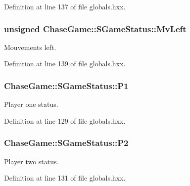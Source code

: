 Definition at line 137 of file globals.\-hxx.

\hypertarget{struct_chase_game_1_1_s_game_status_ae06758bdc7c2bda68801afd314837532}{
\subsubsection[{Mv\-Left}]{\setlength{\rightskip}{0pt plus 5cm}unsigned Chase\-Game\-::\-S\-Game\-Status\-::\-Mv\-Left}}\label{struct_chase_game_1_1_s_game_status_ae06758bdc7c2bda68801afd314837532}


Mouvements left. 



Definition at line 139 of file globals.\-hxx.

\hypertarget{struct_chase_game_1_1_s_game_status_ae939192c0ce625f9cbec50549ec88fac}{
\subsubsection[{P1}]{ Chase\-Game\-::\-S\-Game\-Status\-::\-P1}}\label{struct_chase_game_1_1_s_game_status_ae939192c0ce625f9cbec50549ec88fac}


Player one status. 



Definition at line 129 of file globals.\-hxx.

\hypertarget{struct_chase_game_1_1_s_game_status_a21840b6b133cd5a73d5c0cd3b01116e2}{
\subsubsection[{P2}]{ Chase\-Game\-::\-S\-Game\-Status\-::\-P2}}\label{struct_chase_game_1_1_s_game_status_a21840b6b133cd5a73d5c0cd3b01116e2}


Player two status. 



Definition at line 131 of file globals.\-hxx.

